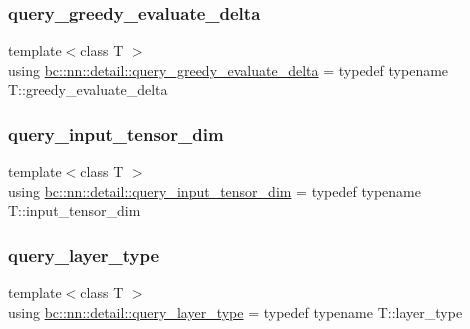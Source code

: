 \mbox{\label{namespacebc_1_1nn_1_1detail_aee17a95f5bdf1a2903f755a7de7ac632}} 
\subsubsection{\texorpdfstring{query\+\_\+greedy\+\_\+evaluate\+\_\+delta}{query\_greedy\_evaluate\_delta}}
{\footnotesize\ttfamily template$<$class T $>$ \\
using \hyperlink{namespacebc_1_1nn_1_1detail_aee17a95f5bdf1a2903f755a7de7ac632}{bc\+::nn\+::detail\+::query\+\_\+greedy\+\_\+evaluate\+\_\+delta} = typedef typename T\+::greedy\+\_\+evaluate\+\_\+delta}

\mbox{\label{namespacebc_1_1nn_1_1detail_a4bdf240452d0d96d1f433e7f0f5dd3e7}} 
\subsubsection{\texorpdfstring{query\+\_\+input\+\_\+tensor\+\_\+dim}{query\_input\_tensor\_dim}}
{\footnotesize\ttfamily template$<$class T $>$ \\
using \hyperlink{namespacebc_1_1nn_1_1detail_a4bdf240452d0d96d1f433e7f0f5dd3e7}{bc\+::nn\+::detail\+::query\+\_\+input\+\_\+tensor\+\_\+dim} = typedef typename T\+::input\+\_\+tensor\+\_\+dim}

\mbox{\label{namespacebc_1_1nn_1_1detail_a2ce86e248ef50dbd6eefccc1333e7814}} 
\subsubsection{\texorpdfstring{query\+\_\+layer\+\_\+type}{query\_layer\_type}}
{\footnotesize\ttfamily template$<$class T $>$ \\
using \hyperlink{namespacebc_1_1nn_1_1detail_a2ce86e248ef50dbd6eefccc1333e7814}{bc\+::nn\+::detail\+::query\+\_\+layer\+\_\+type} = typedef typename T\+::layer\+\_\+type}

